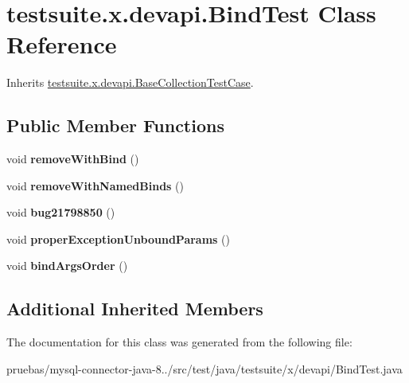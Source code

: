 \hypertarget{classtestsuite_1_1x_1_1devapi_1_1_bind_test}{}\section{testsuite.\+x.\+devapi.\+Bind\+Test Class Reference}
\label{classtestsuite_1_1x_1_1devapi_1_1_bind_test}


Inherits \mbox{\hyperlink{classtestsuite_1_1x_1_1devapi_1_1_base_collection_test_case}{testsuite.\+x.\+devapi.\+Base\+Collection\+Test\+Case}}.

\subsection*{Public Member Functions}
\begin{DoxyCompactItemize}
\item 
\mbox{\label{classtestsuite_1_1x_1_1devapi_1_1_bind_test_ae66a5ff36d074edf10b1a4bf41f71d59}} 
void {\bfseries remove\+With\+Bind} ()
\item 
\mbox{\label{classtestsuite_1_1x_1_1devapi_1_1_bind_test_a4642a4e47c40c09a56e2cc9b1ae00189}} 
void {\bfseries remove\+With\+Named\+Binds} ()
\item 
\mbox{\label{classtestsuite_1_1x_1_1devapi_1_1_bind_test_a61c9cec580b1ca88b38556970df0c8b1}} 
void {\bfseries bug21798850} ()
\item 
\mbox{\label{classtestsuite_1_1x_1_1devapi_1_1_bind_test_a67e7aa077458605d8dcb890e29822185}} 
void {\bfseries proper\+Exception\+Unbound\+Params} ()
\item 
\mbox{\label{classtestsuite_1_1x_1_1devapi_1_1_bind_test_ad1e6bca8857a475a156a49ae62617160}} 
void {\bfseries bind\+Args\+Order} ()
\end{DoxyCompactItemize}
\subsection*{Additional Inherited Members}


The documentation for this class was generated from the following file\+:\begin{DoxyCompactItemize}
\item 
pruebas/mysql-\/connector-\/java-\/8../src/test/java/testsuite/x/devapi/Bind\+Test.\+java\end{DoxyCompactItemize}
